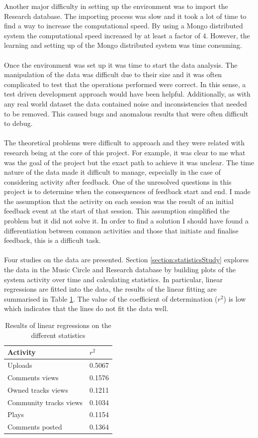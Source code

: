 \documentclass[11pt, oneside]{article}   	%
\begin{document}
Another major difficulty in setting up the environment was to import the Research database. The importing process was slow and it took a lot of time to find a way to increase the computational speed. By using a Mongo distributed system the computational speed increased by at least a factor of 4. However, the learning and setting up of the Mongo distributed system was time consuming.\\\\
Once the environment was set up it was time to start the data analysis. The manipulation of the data was difficult due to their size and it was often complicated to test that the operations performed were correct. In this sense, a test driven development approach would have been helpful. Additionally, as with any real world dataset the data contained noise and inconsistencies that needed to be removed. This caused bugs and anomalous results that were often difficult to debug.\\\\
The theoretical problems were difficult to approach and they were related with research being at the core of this project. For example, it was clear to me what was the goal of the project but the exact path to achieve it was unclear. The time nature of the data made it difficult to manage, especially in the case of considering activity after feedback. One of the unresolved questions in this project is to determine when the consequences of feedback start and end. I made the assumption that the activity on each session was the result of an initial feedback event at the start of that session. This assumption simplified the problem but it did not solve it. In order to find a solution I should have found a differentiation between common activities and those that initiate and finalise feedback, this is a difficult task.\\\\
Four studies on the data are presented. Section \ref{section:statisticsStudy} explores the data in the Music Circle and Research database by building plots of the system activity over time and calculating statistics. In particular, linear regressions are fitted into the data, the results of the linear fitting are summarised in Table \ref{table:initialStudyResults2}. The value of the coefficient of determination ($r^2$) is low which indicates that the lines do not fit the data well.
\begin{table}[h]
	\centering
	\begin{tabular}{| l | l |}
		\hline
		 \textbf{Activity} & \textbf{$r^2$} \\ \hline
		 Uploads & 0.5067 \\ \hline
		 Comments views & 0.1576 \\ \hline
		 Owned tracks views & 0.1211 \\ \hline
		 Community tracks views & 0.1034 \\ \hline
		 Plays & 0.1154 \\ \hline
		 Comments posted & 0.1364 \\ \hline
	\end{tabular}
	\caption{Results of linear regressions on the different statistics}
	\label{table:initialStudyResults2}
\end{table}
\end{document}
